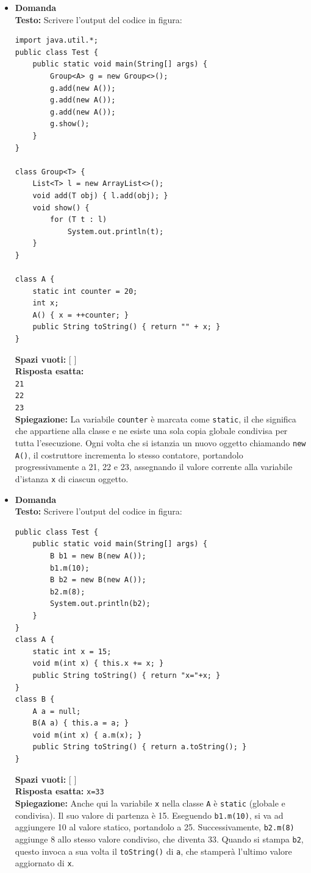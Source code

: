 \documentclass[12pt, a4paper]{article}
\begin{document}
\begin{itemize}
    \item {}\textbf{Domanda \thedomanda} \\
    \textbf{Testo:} Scrivere l'output del codice in figura:
\begin{verbatim}
import java.util.*;
public class Test {
    public static void main(String[] args) {
        Group<A> g = new Group<>();
        g.add(new A());
        g.add(new A());
        g.add(new A());
        g.show();
    }
}

class Group<T> {
    List<T> l = new ArrayList<>();
    void add(T obj) { l.add(obj); }
    void show() {
        for (T t : l)
            System.out.println(t);
    }
}

class A {
    static int counter = 20;
    int x;
    A() { x = ++counter; }
    public String toString() { return "" + x; }
}
\end{verbatim}
    \textbf{Spazi vuoti:} [ \hspace{2cm} ] \\
    \textbf{Risposta esatta:} \\
    \texttt{21} \\
    \texttt{22} \\
    \texttt{23} \\
    \textbf{Spiegazione:} La variabile \texttt{counter} è marcata come \texttt{static}, il che significa che appartiene alla classe e ne esiste una sola copia globale condivisa per tutta l'esecuzione. Ogni volta che si istanzia un nuovo oggetto chiamando \texttt{new A()}, il costruttore incrementa lo stesso contatore, portandolo progressivamente a 21, 22 e 23, assegnando il valore corrente alla variabile d'istanza \texttt{x} di ciascun oggetto.
    \vspace{0.5cm}

    \item {}\textbf{Domanda \thedomanda} \\
    \textbf{Testo:} Scrivere l'output del codice in figura:
\begin{verbatim}
public class Test {
    public static void main(String[] args) {
        B b1 = new B(new A());
        b1.m(10);
        B b2 = new B(new A());
        b2.m(8);
        System.out.println(b2);
    }
}
class A {
    static int x = 15;
    void m(int x) { this.x += x; }
    public String toString() { return "x="+x; }
}
class B {
    A a = null;
    B(A a) { this.a = a; }
    void m(int x) { a.m(x); }
    public String toString() { return a.toString(); }
}
\end{verbatim}
    \textbf{Spazi vuoti:} [ \hspace{2cm} ] \\
    \textbf{Risposta esatta:} \texttt{x=33} \\
    \textbf{Spiegazione:} Anche qui la variabile \texttt{x} nella classe \texttt{A} è \texttt{static} (globale e condivisa). Il suo valore di partenza è 15. Eseguendo \texttt{b1.m(10)}, si va ad aggiungere 10 al valore statico, portandolo a 25. Successivamente, \texttt{b2.m(8)} aggiunge 8 allo stesso valore condiviso, che diventa 33. Quando si stampa \texttt{b2}, questo invoca a sua volta il \texttt{toString()} di \texttt{a}, che stamperà l'ultimo valore aggiornato di \texttt{x}.


\end{itemize}
\end{document}
